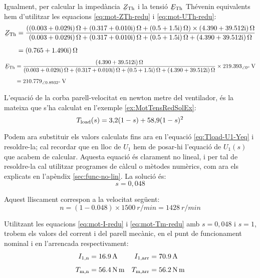\begin{exemple}
	Igualment, per calcular  la impedància $\cmplx{Z}\ped{Th}$ i la tensió $\cmplx{E}\ped{Th}$ Thévenin equivalents hem d'utilitzar les equacions \eqref{eq:mot-ZTh-redu} i \eqref{eq:mot-UTh-redu}:
	\begin{align*}
		\cmplx{Z}\ped{Th} &= \frac{(\complexqty{0,003+j0,029}{\ohm} + \complexqty{0,317+j0,010}{\ohm} +  \complexqty{0,5+j1,5}{\ohm})\times\complexqty{4,390+j39,512}{\ohm}}
		{\complexqty{0,003+j0,029}{\ohm} + \complexqty{0,317+j0,010}{\ohm} + \complexqty{0,5+j1,5}{\ohm}+\complexqty{4,390+j39,512}{\ohm}}  \\[1ex]   
		&= \complexqty{0,765+j1,490}{\ohm}
	\end{align*}
	\vspace{-5mm}
	\begin{align*}		
		\cmplx{E}\ped{Th}  &= \frac{\complexqty{4,390+j39,512}{\ohm}}
		{\complexqty{0,003+j0,029}{\ohm} + \complexqty{0,317+j0,010}{\ohm} + \complexqty{0,5+j1,5}{\ohm}+\complexqty{4,390+j39,512}{\ohm}}\times\qtypd{219,393}{0}{V}  \\[1ex]   
		&=  \qtypd{210,779}{0,8932}{V}
	\end{align*}
	
	L'equació de la corba parell-velocitat en newton metre del ventilador, és la mateixa que s'ha calculat en l'exemple  \ref{ex:MotTensRedSolEx}:
	\[
		T_\mathrm{load}(s) = 3{,}2 (1-s) + 58{,}9 (1-s)^2
	\]
	
	Podem ara substituir els  valors calculats fins ara en l'equació \eqref{eq:Tload-U1-Yeq} i resoldre-la; cal recordar que en lloc de $U_1$ hem de posar-hi l'equació de $U_1(s)$ que acabem de calcular. Aquesta equació és clarament no lineal, i per tal de resoldre-la cal utilitzar programes de càlcul o mètodes numèrics, com ara els explicats en l'apèndix \ref{sec:func-no-lin}. La solució és:
	\[
		s = 0{,}048
	\]
	
	Aquest lliscament correspon a la velocitat següent:
	\[
		n= (1-\num{0,048})\times \qty{1500}{r/min} = \qty{1428}{r/min}
	\]
	
	Utilitzant les equacions \eqref{eq:mot-I-redu} i \eqref{eq:mot-Tm-redu} amb $s=0{,}048$ i $s=1$, trobem els valors del corrent i del parell mecànic, en el punt de funcionament nominal i en l'arrencada respectivament:
	\begin{align*}
		I_\mathrm{1,n} &= \qty{16,9}{A} &
		I_\mathrm{1,arr} &= \qty{70,9}{A} \\[1ex] 
		T_\mathrm{m,n} &=  \qty{56,4}{N.m} &	
		T_\mathrm{m,arr} &=  \qty{56,2}{N.m}
	\end{align*}
	

\end{exemple}
